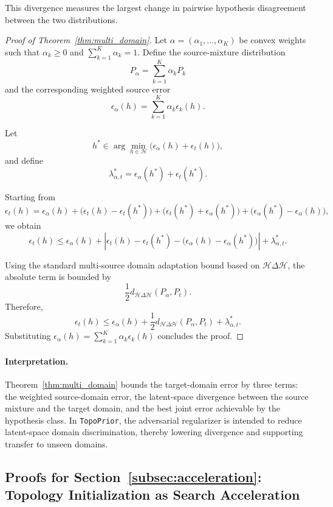 \documentclass[lettersize,journal]{IEEEtran}
\theoremstyle{plain}
\begin{document}
This divergence measures the largest change in pairwise hypothesis disagreement between the two distributions.

\begin{proof}[Proof of Theorem~\ref{thm:multi_domain}]
Let $\alpha = (\alpha_1,\dots,\alpha_K)$ be convex weights such that $\alpha_k \ge 0$ and $\sum_{k=1}^K \alpha_k = 1$. Define the source-mixture distribution
\[
P_\alpha = \sum_{k=1}^K \alpha_k P_k
\]
and the corresponding weighted source error
\[
\epsilon_\alpha(h) = \sum_{k=1}^K \alpha_k \epsilon_k(h).
\]

Let
\[
h^* \in \arg\min_{h\in\mathcal{H}} \bigl(\epsilon_\alpha(h) + \epsilon_t(h)\bigr),
\]
and define
\[
\lambda_{\alpha,t}^* = \epsilon_\alpha(h^*) + \epsilon_t(h^*).
\]

Starting from
\[
\epsilon_t(h)
=
\epsilon_\alpha(h)
+
\bigl(\epsilon_t(h)-\epsilon_t(h^*)\bigr)
+
\bigl(\epsilon_t(h^*)+\epsilon_\alpha(h^*)\bigr)
+
\bigl(\epsilon_\alpha(h^*)-\epsilon_\alpha(h)\bigr),
\]
we obtain
\[
\epsilon_t(h)
\le
\epsilon_\alpha(h)
+
\left|
\epsilon_t(h)-\epsilon_t(h^*)
-
\bigl(\epsilon_\alpha(h)-\epsilon_\alpha(h^*)\bigr)
\right|
+
\lambda_{\alpha,t}^*.
\]

Using the standard multi-source domain adaptation bound based on $\mathcal{H}\Delta\mathcal{H}$, the absolute term is bounded by
\[
\frac{1}{2}d_{\mathcal{H}\Delta\mathcal{H}}(P_\alpha,P_t).
\]
Therefore,
\[
\epsilon_t(h)
\le
\epsilon_\alpha(h)
+
\frac{1}{2}d_{\mathcal{H}\Delta\mathcal{H}}(P_\alpha,P_t)
+
\lambda_{\alpha,t}^*.
\]
Substituting $\epsilon_\alpha(h)=\sum_{k=1}^K \alpha_k \epsilon_k(h)$ concludes the proof.
\end{proof}

\paragraph{Interpretation.}
Theorem~\ref{thm:multi_domain} bounds the target-domain error by three terms: the weighted source-domain error, the latent-space divergence between the source mixture and the target domain, and the best joint error achievable by the hypothesis class. In \texttt{TopoPrior}, the adversarial regularizer is intended to reduce latent-space domain discrimination, thereby lowering divergence and supporting transfer to unseen domains.

\subsection{Proofs for Section~\ref{subsec:acceleration}: Topology Initialization as Search Acceleration}
\label{app:acceleration}
\end{document}
